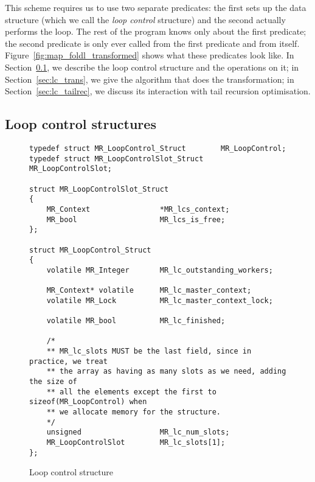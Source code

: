 This scheme requires us to use two separate predicates:
the first sets up the data structure
(which we call the \emph{loop control} structure)
and the second actually performs the loop.
The rest of the program knows only about the first predicate;
the second predicate is only ever called from the first predicate
and from itself.
Figure~\ref{fig:map_foldl_transformed} shows what these predicates look like.
In Section~\ref{sec:lc_structs},
we describe the loop control structure and the operations on it;
in Section~\ref{sec:lc_trans},
we give the algorithm that does the transformation;
in Section~\ref{sec:lc_tailrec},
we discuss its interaction with tail recursion optimisation.

\subsection{Loop control structures}
\label{sec:lc_structs}

\begin{figure}
\begin{verbatim}
typedef struct MR_LoopControl_Struct        MR_LoopControl;
typedef struct MR_LoopControlSlot_Struct    MR_LoopControlSlot;

struct MR_LoopControlSlot_Struct
{
    MR_Context                *MR_lcs_context;
    MR_bool                   MR_lcs_is_free;
};

struct MR_LoopControl_Struct
{
    volatile MR_Integer       MR_lc_outstanding_workers;

    MR_Context* volatile      MR_lc_master_context;
    volatile MR_Lock          MR_lc_master_context_lock;

    volatile MR_bool          MR_lc_finished;

    /*
    ** MR_lc_slots MUST be the last field, since in practice, we treat
    ** the array as having as many slots as we need, adding the size of
    ** all the elements except the first to sizeof(MR_LoopControl) when
    ** we allocate memory for the structure.
    */
    unsigned                  MR_lc_num_slots;
    MR_LoopControlSlot        MR_lc_slots[1];
};
\end{verbatim}
\caption{Loop control structure}
\label{fig:loop_control_structure}
\end{figure}

